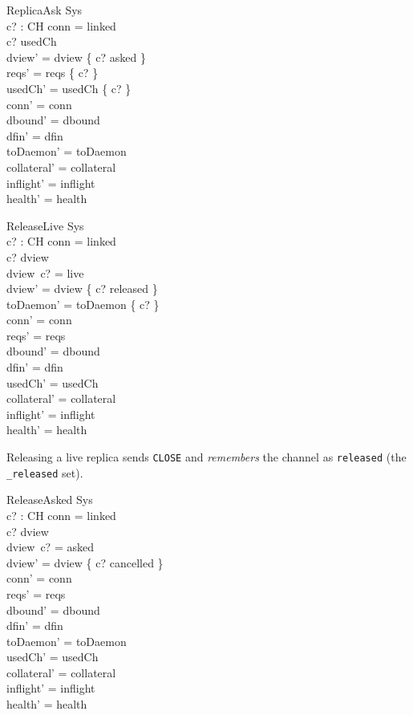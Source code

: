 \documentclass[a4paper,10pt,fleqn]{article}
\begin{document}
\begin{schema}{ReplicaAsk}
  \Delta Sys \\
  c? : CH
\where
  conn = linked \\
  c? \notin usedCh \\
  dview' = dview \cup \{ c? \mapsto asked \} \\
  reqs' = reqs \cup \{ c? \} \\
  usedCh' = usedCh \cup \{ c? \} \\
  conn' = conn \\
  dbound' = dbound \\
  dfin' = dfin \\
  toDaemon' = toDaemon \\
  collateral' = collateral \\
  inflight' = inflight \\
  health' = health
\end{schema}

\begin{schema}{ReleaseLive}
  \Delta Sys \\
  c? : CH
\where
  conn = linked \\
  c? \in \dom dview \\
  dview~c? = live \\
  dview' = dview \oplus \{ c? \mapsto released \} \\
  toDaemon' = toDaemon \cup \{ c? \} \\
  conn' = conn \\
  reqs' = reqs \\
  dbound' = dbound \\
  dfin' = dfin \\
  usedCh' = usedCh \\
  collateral' = collateral \\
  inflight' = inflight \\
  health' = health
\end{schema}

Releasing a live replica sends \texttt{CLOSE} and \emph{remembers} the
channel as \texttt{released} (the \texttt{\_released} set).

\begin{schema}{ReleaseAsked}
  \Delta Sys \\
  c? : CH
\where
  conn = linked \\
  c? \in \dom dview \\
  dview~c? = asked \\
  dview' = dview \oplus \{ c? \mapsto cancelled \} \\
  conn' = conn \\
  reqs' = reqs \\
  dbound' = dbound \\
  dfin' = dfin \\
  toDaemon' = toDaemon \\
  usedCh' = usedCh \\
  collateral' = collateral \\
  inflight' = inflight \\
  health' = health
\end{schema}
\end{document}
